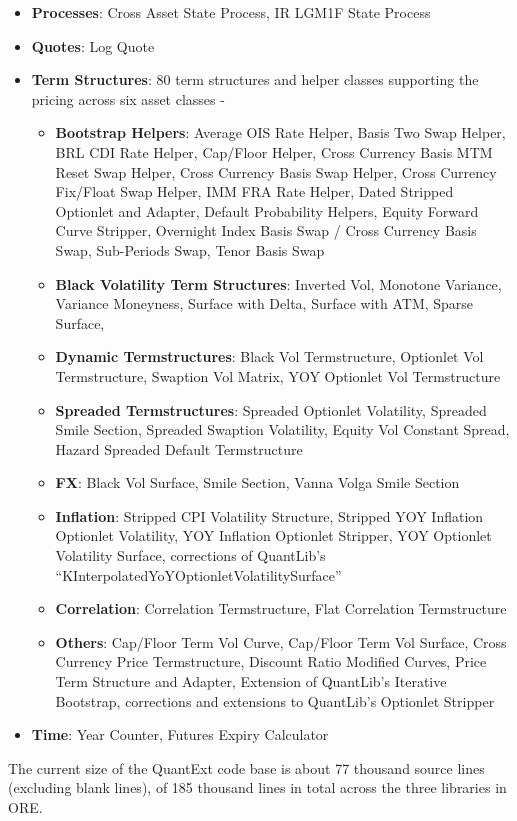 \documentclass[12pt, a4paper]{article}
\begin{document}
\begin{itemize}
\item {\bf Processes}: Cross Asset State Process, IR LGM1F State Process
\item {\bf Quotes}: Log Quote
\item {\bf Term Structures}: 80 term structures and helper classes supporting the pricing across six asset classes -
\begin{itemize}
\item {\bf Bootstrap Helpers}: Average OIS Rate Helper, Basis Two Swap Helper, BRL CDI Rate Helper, Cap/Floor Helper, Cross Currency Basis MTM Reset Swap Helper, Cross Currency Basis Swap Helper, Cross Currency Fix/Float Swap Helper, IMM FRA Rate Helper, Dated Stripped Optionlet and Adapter, Default Probability Helpers, Equity Forward Curve Stripper, Overnight Index Basis Swap / Cross Currency Basis Swap, Sub-Periods Swap, Tenor Basis Swap
\item {\bf Black Volatility Term Structures}: Inverted Vol, Monotone Variance, Variance Moneyness, Surface with Delta, Surface with ATM, Sparse Surface, 
\item {\bf Dynamic Termstructures}: Black Vol Termstructure, Optionlet Vol Termstructure, Swaption Vol Matrix, YOY Optionlet Vol Termstructure
\item {\bf Spreaded Termstructures}: Spreaded Optionlet Volatility, Spreaded Smile Section, Spreaded Swaption Volatility, Equity Vol Constant Spread, Hazard Spreaded Default Termstructure
\item {\bf FX}: Black Vol Surface, Smile Section, Vanna Volga Smile Section
\item {\bf Inflation}: Stripped CPI Volatility Structure, Stripped YOY Inflation Optionlet Volatility, YOY Inflation Optionlet Stripper, YOY Optionlet Volatility Surface, corrections of QuantLib's ``KInterpolatedYoYOptionletVolatilitySurface''
\item {\bf Correlation}: Correlation Termstructure, Flat Correlation Termstructure
\item {\bf Others}: Cap/Floor Term Vol Curve, Cap/Floor Term Vol Surface, Cross Currency Price Termstructure, Discount Ratio Modified Curves, Price Term Structure and Adapter, Extension of QuantLib's Iterative Bootstrap, corrections and extensions to QuantLib's Optionlet Stripper
\end{itemize}
\item {\bf Time}: Year Counter, Futures Expiry Calculator
\end{itemize}

The current size of the QuantExt code base is about 77 thousand source lines (excluding blank lines), of 185 thousand lines in total across the three libraries in ORE.
\end{document}
